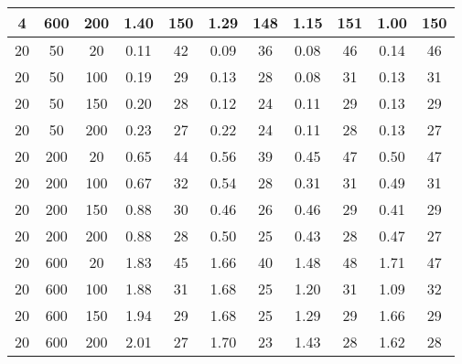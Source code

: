 \documentclass{article}
\begin{document}
\begin{center}
\begin{tabular}{| c c c | c c | c c | c c | c c |}
            \hline
            4          & 600     & 200 & 1.40   & 150        & 1.29   & 148        & 1.15   & 151        & 1.00   & 150        \\
            \hline
            20         & 50      & 20  & 0.11   & 42         & 0.09   & 36         & 0.08   & 46         & 0.14   & 46         \\
            \hline
            20         & 50      & 100 & 0.19   & 29         & 0.13   & 28         & 0.08   & 31         & 0.13   & 31         \\
            \hline
            20         & 50      & 150 & 0.20   & 28         & 0.12   & 24         & 0.11   & 29         & 0.13   & 29         \\
            \hline
            20         & 50      & 200 & 0.23   & 27         & 0.22   & 24         & 0.11   & 28         & 0.13   & 27         \\
            \hline
            20         & 200     & 20  & 0.65   & 44         & 0.56   & 39         & 0.45   & 47         & 0.50   & 47         \\
            \hline
            20         & 200     & 100 & 0.67   & 32         & 0.54   & 28         & 0.31   & 31         & 0.49   & 31         \\
            \hline
            20         & 200     & 150 & 0.88   & 30         & 0.46   & 26         & 0.46   & 29         & 0.41   & 29         \\
            \hline
            20         & 200     & 200 & 0.88   & 28         & 0.50   & 25         & 0.43   & 28         & 0.47   & 27         \\
            \hline
            20         & 600     & 20  & 1.83   & 45         & 1.66   & 40         & 1.48   & 48         & 1.71   & 47         \\
            \hline
            20         & 600     & 100 & 1.88   & 31         & 1.68   & 25         & 1.20   & 31         & 1.09   & 32         \\
            \hline
            20         & 600     & 150 & 1.94   & 29         & 1.68   & 25         & 1.29   & 29         & 1.66   & 29         \\
            \hline
            20         & 600     & 200 & 2.01   & 27         & 1.70   & 23         & 1.43   & 28         & 1.62   & 28         \\
            \hline
        \end{tabular}
    \end{center}
\end{document}
